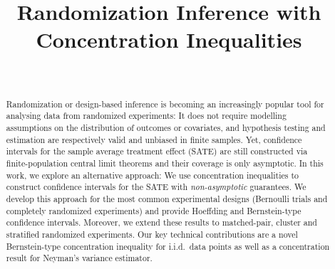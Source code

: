 \documentclass[aos]{imsart2}
\theoremstyle{plain}
\theoremstyle{definition}
\begin{document}
\begin{frontmatter}
\title{Randomization Inference with Concentration Inequalities}

\begin{aug}
\author{~ }
\address{Institute of Mathematics, \'Ecole Polytechnique F\'ed\'erale de Lausanne }
\end{aug}

\begin{abstract}
Randomization or design-based inference is becoming an increasingly popular tool for analysing data from randomized experiments: It does not require modelling assumptions on the distribution of outcomes or covariates, and hypothesis testing and estimation are respectively valid and unbiased in finite samples. Yet, confidence intervals for the sample average treatment effect (SATE) are still constructed via finite-population central limit theorems and their coverage is only asymptotic. In this work, we explore an alternative approach: We use concentration inequalities to construct confidence intervals for the SATE with \emph{non-asymptotic} guarantees. We develop this approach for the most common experimental designs (Bernoulli trials and completely randomized experiments) and provide Hoeffding and Bernstein-type confidence intervals. Moreover, we extend these results to matched-pair, cluster and stratified randomized experiments. Our key technical contributions are a novel Bernstein-type concentration inequality for i.i.d.\ data points as well as a concentration result for Neyman's variance estimator.
\end{abstract}



\end{frontmatter}
\end{document}

